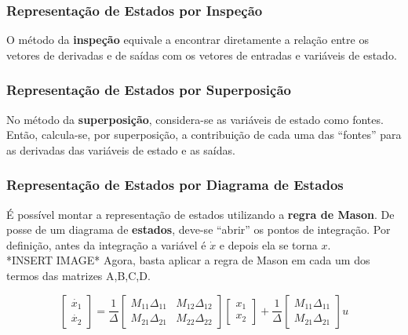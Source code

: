 \documentclass{article}
\numberwithin{equation}{section}
\begin{document}
    \subsubsection{Representação de Estados por Inspeção}
    \label{subsubsec:est_inspeção}
    O método da \textbf{inspeção} equivale a encontrar diretamente a relação entre os vetores de derivadas e de saídas com os vetores de entradas e variáveis de estado.

    \subsubsection{Representação de Estados por Superposição}
    \label{subsubsec:est_superposição}
    No método da \textbf{superposição}, considera-se as variáveis de estado como fontes. Então, calcula-se, por superposição, a contribuição de cada uma das ``fontes'' para as derivadas das variáveis de estado e as saídas.

    \subsubsection{Representação de Estados por Diagrama de Estados}
    \label{subsubsec:est_mason}
    É possível montar a representação de estados utilizando a \textbf{regra de Mason}. De posse de um diagrama de \textbf{estados}, deve-se ``abrir'' os pontos de integração. Por definição, antes da integração a variável é $\dot x$ e depois ela se torna $x$. \\
    *INSERT IMAGE*
    Agora, basta aplicar a regra de Mason em cada um dos termos das matrizes A,B,C,D.

    \begin{equation*}
        \begin{bmatrix}
            \dot{x_{1}}  \\
            \dot{x_{2}}
        \end{bmatrix}
        = \frac{1}{\Delta} %
        \begin{bmatrix}
            M_{11}\Delta_{11} & M_{12}\Delta_{12}\\
            M_{21}\Delta_{21} & M_{22}\Delta_{22}
        \end{bmatrix}
        \begin{bmatrix}
            x_{1} \\
            x_{2}
        \end{bmatrix}
        + \frac{1}{\Delta}%
        \begin{bmatrix}
            M_{11}\Delta_{11}\\
            M_{21}\Delta_{21}
        \end{bmatrix}
        u
    \end{equation*}
\end{document}
